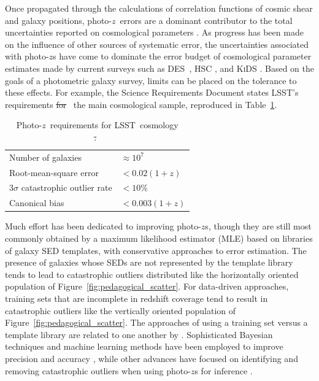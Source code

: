 \documentclass[iop]{emulateapj}
\newcommand{\new}[2]{{\color{red}\sout{#1}}\ {\color{blue}{#2}}}%
\newcommand{\Fig}[1]{Figure~\ref{#1}}
\newcommand{\project}[1]{\textsc{#1}}
\newcommand{\lsst}{\project{LSST}}
\newcommand{\des}{\project{DES}}
\newcommand{\pz}{photo-$z$}
\newcommand{\Pz}{Photo-$z$}
\begin{document}
Once propagated through the calculations of correlation functions of cosmic shear and galaxy positions, \pz\ errors are a dominant contributor to the total uncertainties reported on cosmological parameters \citep{abruzzo_impact_2019}.
As progress has been made on the influence of other sources of systematic error, the uncertainties associated with \pz s have come to dominate the error budget of cosmological parameter estimates made by current surveys such as \des\ \citep{hoyle_dark_2018}, \project{HSC} \citep{tanaka_photometric_2018}, and \project{KiDS} \citep{hildebrandt_kids-450:_2017}.
Based on the goals of a photometric galaxy survey, limits can be placed on the tolerance to these effects.
For example, the Science Requirements Document \citep{mandelbaum_weak_2017} states \lsst's requirements \new{for}{on \pz\ error tolerances for constraining cosmology with} the main cosmological sample, reproduced in Table~\ref{tab:lsstsrd}.

\begin{table}
	\begin{center}
		\caption{\Pz\ requirements for \lsst\ cosmology\\
				\citep{mandelbaum_weak_2017}\new{.}{}}
		\begin{tabular}{ll}
			Number of galaxies & $\approx 10^{7}$\\
			Root-mean-square error & $< 0.02 (1 + z)$\\
			$3 \sigma$ catastrophic outlier rate & $< 10\%$\\
			Canonical bias & $< 0.003 (1 + z)$\\
		\end{tabular}
		\label{tab:lsstsrd}
	\end{center}
\end{table}

Much effort has been dedicated to improving \pz s, though they are still most commonly obtained by a maximum likelihood estimator (MLE) based on libraries of galaxy SED templates, with conservative approaches to error estimation.
The presence of galaxies whose SEDs are not represented by the template library tends to lead to catastrophic outliers distributed like the horizontally oriented population of \Fig{fig:pedagogical_scatter}.
For data-driven approaches, training sets that are incomplete in redshift coverage tend to result in catastrophic outliers like the vertically oriented population of \Fig{fig:pedagogical_scatter}.
The approaches of using a training set versus a template library are related to one another by \citet{budavari_unified_2009}.
Sophisticated Bayesian techniques and machine learning methods have been employed to improve precision \citep{carliles_random_2010} and accuracy \citep{sadeh_annz2:_2016}, while other advances have focused on identifying and removing catastrophic outliers when using \pz s for inference \citep{gorecki_new_2014}. 
\end{document}
